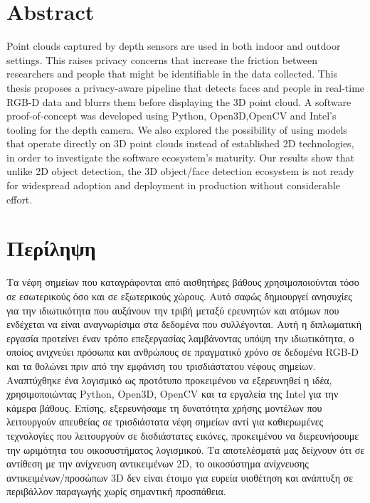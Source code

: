 %


\chapter*{Abstract}
\label{sec:abstract}
Point clouds captured by depth sensors are used in both indoor and outdoor settings.
This raises privacy concerns that increase the friction between researchers and people
that might be identifiable in the data collected. This thesis proposes a privacy-aware
pipeline that detects faces and people in real-time RGB-D data and blurrs them before
displaying the 3D point cloud. A software proof-of-concept was developed using Python,
Open3D,OpenCV and Intel's tooling for the depth camera. We also explored the possibility
of using models that operate directly on 3D point clouds instead of established 2D technologies,
in order to investigate the software ecosystem's maturity. Our results show that unlike
2D object detection, the 3D object/face detection ecosystem is not ready for widespread
adoption and deployment in production without considerable effort.




\chapter*{Περίληψη}
\label{sec:abstract_greek}
Τα νέφη σημείων που καταγράφονται από αισθητήρες βάθους χρησιμοποιούνται τόσο σε εσωτερικούς όσο και σε εξωτερικούς χώρους.
Αυτό σαφώς δημιουργεί ανησυχίες για την ιδιωτικότητα που αυξάνουν την τριβή μεταξύ ερευνητών και ατόμων που ενδέχεται να είναι αναγνωρίσιμα στα δεδομένα που συλλέγονται.
Αυτή η διπλωματική εργασία προτείνει έναν τρόπο επεξεργασίας λαμβάνοντας υπόψη την ιδιωτικότητα,
ο οποίος ανιχνεύει πρόσωπα και ανθρώπους σε πραγματικό χρόνο σε δεδομένα RGB-D και τα θολώνει πριν
από την εμφάνιση του τρισδιάστατου νέφους σημείων. Αναπτύχθηκε ένα λογισμικό ως προτότυπο προκειμένου
να εξερευνηθεί η ιδέα, χρησιμοποιώντας Python, Open3D, OpenCV και τα εργαλεία της Intel για την κάμερα βάθους.
Επίσης, εξερευνήσαμε τη δυνατότητα χρήσης μοντέλων που λειτουργούν απευθείας σε τρισδιάστατα νέφη σημείων αντί
για καθιερωμένες τεχνολογίες που λειτουργούν σε δισδιάστατες εικόνες, προκειμένου να διερευνήσουμε την ωριμότητα
του οικοσυστήματος λογισμικού.
Τα αποτελέσματά μας δείχνουν ότι σε αντίθεση με την ανίχνευση αντικειμένων 2D, το οικοσύστημα ανίχνευσης
αντικειμένων/προσώπων 3D δεν είναι έτοιμο για ευρεία υιοθέτηση και ανάπτυξη σε περιβάλλον παραγωγής χωρίς σημαντική προσπάθεια.
